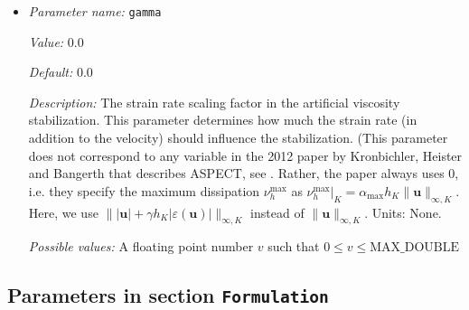 \begin{itemize}
{\it Possible values:} A list of 0 to 4294967295 elements where each element is [A floating point number $v$ such that $0 \leq v \leq \text{MAX\_DOUBLE}$]
\item {\it Parameter name:} {\tt gamma}
\label{parameters:Discretization/Stabilization parameters/gamma}
\label{parameters:Discretization/Stabilization_20parameters/gamma}


{\it Value:} 0.0


{\it Default:} 0.0


{\it Description:} The strain rate scaling factor in the artificial viscosity stabilization. This parameter determines how much the strain rate (in addition to the velocity) should influence the stabilization. (This parameter does not correspond to any variable in the 2012 paper by Kronbichler, Heister and Bangerth that describes ASPECT, see \cite{KHB12}. Rather, the paper always uses 0, i.e. they specify the maximum dissipation $\nu_h^\text{max}$ as $\nu_h^\text{max}\vert_K = \alpha_{\text{max}} h_K \|\mathbf u\|_{\infty,K}$. Here, we use $\|\lvert\mathbf u\rvert + \gamma h_K \lvert\varepsilon (\mathbf u)\rvert\|_{\infty,K}$ instead of $\|\mathbf u\|_{\infty,K}$. Units: None.


{\it Possible values:} A floating point number $v$ such that $0 \leq v \leq \text{MAX\_DOUBLE}$
\end{itemize}

\subsection{Parameters in section \tt Formulation}
\label{parameters:Formulation}

